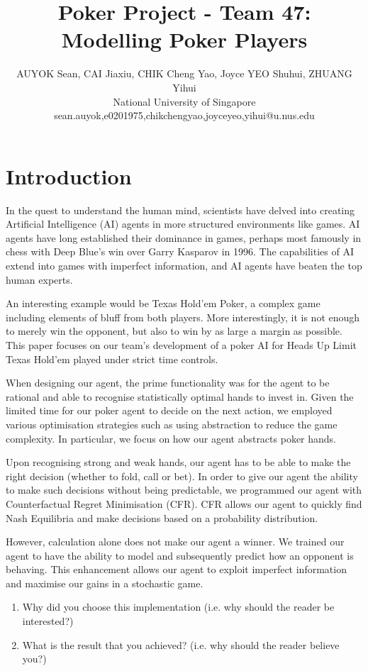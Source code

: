 \documentclass{article}
\title{Poker Project - Team 47: Modelling Poker Players}
\author{
AUYOK Sean, CAI Jiaxiu, CHIK Cheng Yao, Joyce YEO Shuhui, ZHUANG Yihui
\\ 
National University of Singapore\\
sean.auyok,e0201975,chikchengyao,joyceyeo,yihui@u.nus.edu
}
\begin{document}
\maketitle

\section{Introduction}

In the quest to understand the human mind, scientists have delved into creating Artificial Intelligence (AI) agents in more structured environments like games. AI agents have long established their dominance in games, perhaps most famously in chess with Deep Blue's win over Garry Kasparov in 1996. The capabilities of AI extend into games with imperfect information, and AI agents have beaten the top human experts. 

An interesting example would be Texas Hold'em Poker, a complex game including elements of bluff from both players. More interestingly, it is not enough to merely win the opponent, but also to win by as large a margin as possible. This paper focuses on our team's development of a poker AI for Heads Up Limit Texas Hold'em played under strict time controls. 

When designing our agent, the prime functionality was for the agent to be rational and able to recognise statistically optimal hands to invest in. Given the limited time for our poker agent to decide on the next action, we employed various optimisation strategies such as using abstraction to reduce the game complexity. In particular, we focus on how our agent abstracts poker hands. 

Upon recognising strong and weak hands, our agent has to be able to make the right decision (whether to fold, call or bet). In order to give our agent the ability to make such decisions without being predictable, we programmed our agent with Counterfactual Regret Minimisation (CFR). CFR allows our agent to quickly find Nash Equilibria and make decisions based on a probability distribution.

However, calculation alone does not make our agent a winner. We trained our agent to have the ability to model and subsequently predict how an opponent is behaving. This enhancement allows our agent to exploit imperfect information and maximise our gains in a stochastic game.

\begin{enumerate}
	\item Why did you choose this implementation (i.e. why should the reader be interested?)
	\item What is the result that you achieved? (i.e. why should the reader believe you?)
\end{enumerate}
\end{document}
